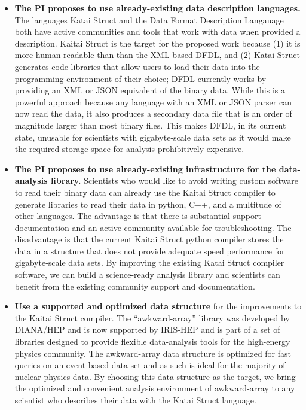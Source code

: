 \begin{itemize}
    \item \textbf{The PI proposes to use already-existing data description languages.}  The languages Katai Struct and the Data Format Description Langauage both have active communities and tools that work with data when provided a description.  Kaitai Struct is the target for the proposed work because (1) it is more human-readable than than the XML-based DFDL, and (2) Katai Struct generates code libraries that allow users to load their data into the programming environment of their choice; DFDL currently works by providing an XML or JSON equivalent of the binary data.  While this is a powerful approach because any language with an XML or JSON parser can now read the data, it also produces a secondary data file that is an order of magnitude larger than most binary files.  This makes DFDL, in its current state, unusable for scientists with gigabyte-scale data sets as it would make the required storage space for analysis prohibitively expensive.
    \item \textbf{The PI proposes to use already-existing infrastructure for the data-analysis library.}  Scientists who would like to avoid writing custom software to read their binary data can already use the Kaitai Struct compiler to generate libraries to read their data in python, C++, and a multitude of other languages.  The advantage is that there is substantial support documentation and an active community available for troubleshooting.  The disadvantage is that the current Kaitai Struct python compiler stores the data in a structure that does not provide adequate speed performance for gigabyte-scale data sets.  By improving the existing Katai Struct compiler software, we can build a science-ready analysis library and scientists can benefit from the existing community support and documentation.   
    \item \textbf{Use a supported and optimized data structure}  for the improvements to the Kaitai Struct compiler.  The ``awkward-array'' library was developed by DIANA/HEP and is now supported by IRIS-HEP and is part of a set of libraries designed to provide flexible data-analysis tools for the high-energy physics community.  The awkward-array data structure is optimized for fast queries on an event-based data set and as such is ideal for the majority of nuclear physics data.  By choosing this data structure as the target, we bring the optimized and convenient analysis environment of awkward-array to any scientist who describes their data with the Katai Struct language.

\end{itemize}
